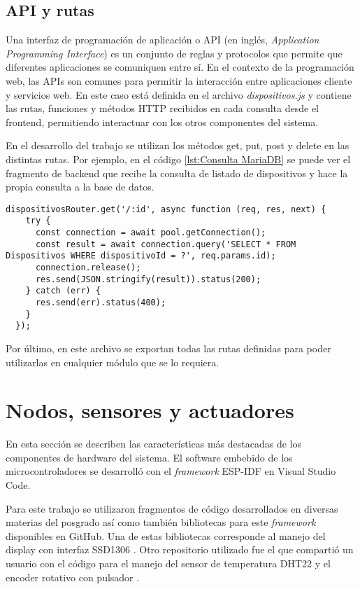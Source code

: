 \subsection{API y rutas}

Una interfaz de programación de aplicación o API (en inglés, \textit{Application Programming Interface}) es un conjunto de reglas y protocolos que permite que diferentes aplicaciones se comuniquen entre sí. En el contexto de la programación web, las APIs son comunes para permitir la interacción entre aplicaciones cliente y servicios web. En este caso está definida en el archivo \textit{dispositivos.js} y contiene las rutas, funciones y métodos HTTP recibidos en cada consulta desde el frontend, permitiendo interactuar con los otros componentes del sistema.

En el desarrollo del trabajo se utilizan los métodos get, put, post y delete en las distintas rutas. Por ejemplo, en el código \ref{lst:Consulta MariaDB} se puede ver el fragmento de backend que recibe la consulta de listado de dispositivos y hace la propia consulta a la base de datos.

\begin{lstlisting}[caption={Consulta de listado de dispositivos al backend.}, label={lst:Consulta MariaDB}]
dispositivosRouter.get('/:id', async function (req, res, next) {
    try {
      const connection = await pool.getConnection();
      const result = await connection.query('SELECT * FROM Dispositivos WHERE dispositivoId = ?', req.params.id);
      connection.release();
      res.send(JSON.stringify(result)).status(200);
    } catch (err) {
      res.send(err).status(400);
    }
  });
\end{lstlisting}

Por último, en este archivo se exportan todas las rutas definidas para poder utilizarlas en cualquier módulo que se lo requiera.

\section{Nodos, sensores y actuadores}

En esta sección se describen las características más destacadas de los componentes de hardware del sistema. El software embebido de los microcontroladores se desarrolló con el \textit{framework} ESP-IDF \citep{36} en Visual Studio Code.

Para este trabajo se utilizaron fragmentos de código desarrollados en diversas materias del posgrado así como también bibliotecas para este \textit{framework} disponibles en GitHub. Una de estas bibliotecas corresponde al manejo del display con interfaz SSD1306 \citep{37}. Otro repositorio utilizado fue el que compartió un usuario con el código para el manejo del sensor de temperatura DHT22 y el encoder rotativo con pulsador \citep{38}.

